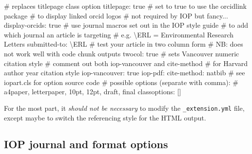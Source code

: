 \documentclass[
  12pt]{iopart}
\newenvironment{Shaded}{\begin{snugshade}}{\end{snugshade}}
\newcommand{\AttributeTok}[1]{\textcolor[rgb]{0.40,0.45,0.13}{#1}}
\newcommand{\CharTok}[1]{\textcolor[rgb]{0.13,0.47,0.30}{#1}}
\newcommand{\CommentTok}[1]{\textcolor[rgb]{0.37,0.37,0.37}{#1}}
\newcommand{\FunctionTok}[1]{\textcolor[rgb]{0.28,0.35,0.67}{#1}}
\newcommand{\KeywordTok}[1]{\textcolor[rgb]{0.00,0.23,0.31}{#1}}
\begin{document}
\begin{Shaded}
\begin{Highlighting}[]
\CommentTok{\# replaces titlepage class option}
\FunctionTok{titlepage}\KeywordTok{:}\AttributeTok{ }\CharTok{true}
\CommentTok{\# set to true to use the orcidlink package}
\CommentTok{\# to display linked orcid logos}
\CommentTok{\# not required by IOP but fancy...}
\FunctionTok{display{-}orcids}\KeywordTok{:}\AttributeTok{ }\CharTok{true}
\CommentTok{\# use journal macros set out in the IOP style guide}
\CommentTok{\# to add which journal an article is targeting}
\CommentTok{\# e.g. \textbackslash{}ERL = Environmental Research Letters}
\FunctionTok{submitted{-}to}\KeywordTok{:}\AttributeTok{ \textbackslash{}ERL}
\CommentTok{\# test your article in two column form}
\CommentTok{\# NB: does not work well with code chunk outputs}
\FunctionTok{twocol}\KeywordTok{:}\AttributeTok{ }\CharTok{true}
\CommentTok{\# sets Vancouver numeric citation style}
\CommentTok{\# comment out both iop{-}vancouver and cite{-}method}
\CommentTok{\# for Harvard author year citation style}
\FunctionTok{iop{-}vancouver}\KeywordTok{:}\AttributeTok{ }\CharTok{true}
\FunctionTok{iop{-}pdf}\KeywordTok{:}
\AttributeTok{  }\FunctionTok{cite{-}method}\KeywordTok{:}\AttributeTok{ natbib}
\CommentTok{\# see iopart.cls for option source code}
\CommentTok{\# possible options (separate with comma):}
\CommentTok{\# a4paper, letterpaper, 10pt, 12pt, draft, final}
\FunctionTok{classoptions}\KeywordTok{:}\AttributeTok{ }\KeywordTok{[]}
\end{Highlighting}
\end{Shaded}

For the most part, it \emph{should not be necessary} to modify the
\texttt{\_extension.yml} file, except maybe to switch the referencing
style for the HTML output.

\subsection{IOP journal and format
options}\label{iop-journal-and-format-options}
\end{document}
